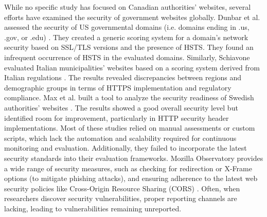 \documentclass[pdflatex,sn-mathphys-num]{sn-jnl}
\numberwithin{equation}{section}
\theoremstyle{thmstyleone}
\theoremstyle{thmstyletwo}%
\theoremstyle{thmstylethree}%
\begin{document}


\vspace{1em}While no specific study has focused on Canadian authorities' websites, several efforts have 
examined the security of government websites globally.     
Dunbar et al. assessed the security of US governmental domains (i.e. domains ending in .us, 
.gov, or .edu) \cite{dunbar4240917survey}. 
They created a generic scoring system for a domain's network security based on SSL/TLS 
versions and the presence of HSTS. They found an infrequent occurrence of HSTS in the evaluated 
domains. 
Similarly, Schiavone evaluated Italian municipalities' websites based on a scoring system derived 
from Italian regulations \cite{schiavone2024municipality2https}. The results 
revealed discrepancies between regions and demographic groups in terms of HTTPS implementation 
and regulatory compliance. Max et al. built a tool to analyze the security readiness of 
Swedish authorities' websites \cite{valdaserides2024automated}. The results showed a good overall security
 level but identified room for improvement, particularly in HTTP security header implementations. 
Most of these studies relied on manual assessments or custom scripts, which lack the automation 
and scalability required for continuous monitoring and evaluation. Additionally, they
 failed to incorporate the latest security standards into their evaluation frameworks. 
 Mozilla Observatory provides a wide range of security measures, such as 
 checking for redirection or X-Frame options (to mitigate phishing attacks), and ensuring 
 adherence to the latest web security policies like Cross-Origin Resource Sharing (CORS) 
 \cite{felt2017measuring}. 
Often, when researchers discover security vulnerabilities, proper reporting channels are lacking,
 leading to vulnerabilities remaining unreported.
\end{document}
